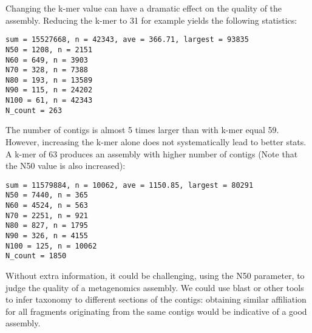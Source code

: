\begin{warning}
Changing the k-mer value can have a dramatic effect on the quality of the assembly. Reducing the k-mer to 31 for example yields the following statistics:
\begin{lstlisting}
sum = 15527668, n = 42343, ave = 366.71, largest = 93835
N50 = 1208, n = 2151
N60 = 649, n = 3903
N70 = 328, n = 7388
N80 = 193, n = 13589
N90 = 115, n = 24202
N100 = 61, n = 42343
N_count = 263
\end{lstlisting}

The number of contigs is almost 5 times larger than with k-mer equal 59. However, increasing the k-mer alone does not systematically lead to better stats. A k-mer of 63 produces an assembly with higher number of contigs (Note that the N50 value is also increased):

\begin{lstlisting}
sum = 11579884, n = 10062, ave = 1150.85, largest = 80291
N50 = 7440, n = 365
N60 = 4524, n = 563
N70 = 2251, n = 921
N80 = 827, n = 1795
N90 = 326, n = 4155
N100 = 125, n = 10062
N_count = 1850
\end{lstlisting}

Without extra information, it could be challenging, using the N50 parameter, to judge the quality of a metagenomics assembly. We could use blast or other tools to infer taxonomy to different sections of the contigs: obtaining similar affiliation for all fragments originating from the same contigs would be indicative of a good assembly.

\end{warning}

